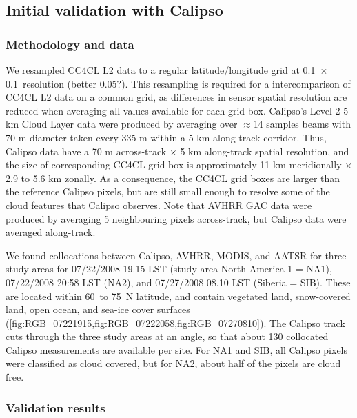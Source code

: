\subsection{Initial validation with Calipso}

\subsubsection{Methodology and data}\label{sec:calipso_method}
 
We resampled CC4CL L2 data to a regular latitude/longitude grid at 0.1\textdegree\ $\times$ 0.1\textdegree\ resolution (better 0.05?). This resampling is required for a intercomparison of CC4CL L2 data on a common grid, as differences in sensor spatial resolution are reduced when averaging all values available for each grid box. Calipso's Level 2 5 km Cloud Layer data were produced by averaging over $\approx$14 samples beams with 70 m diameter taken every 335 m within a 5 km along-track corridor. Thus, Calipso data have a 70 m across-track $\times$ 5 km along-track spatial resolution, and the size of corresponding CC4CL grid box is approximately 11 km meridionally $\times$ 2.9 to 5.6 km zonally. As a consequence, the CC4CL grid boxes are larger than the reference Calipso pixels, but are still small enough to resolve some of the cloud features that Calipso observes. Note that AVHRR GAC data were produced by averaging 5 neighbouring pixels across-track, but Calipso data were averaged along-track.
 
We found collocations between Calipso, AVHRR, MODIS, and AATSR for three study areas for 07/22/2008 19.15 LST (study area North America 1 = NA1), 07/22/2008 20:58 LST (NA2), and 07/27/2008 08.10 LST (Siberia = SIB). These are located within 60\textdegree\ to 75\textdegree\ N latitude, and contain vegetated land, snow-covered land, open ocean, and sea-ice cover surfaces (\cref{fig:RGB_07221915,fig:RGB_07222058,fig:RGB_07270810}). The Calipso track cuts through the three study areas at an angle, so that about 130 collocated Calipso measurements are available per site. For NA1 and SIB, all Calipso pixels were classified as cloud covered, but for NA2, about half of the pixels are cloud free.

\subsubsection{Validation results}

